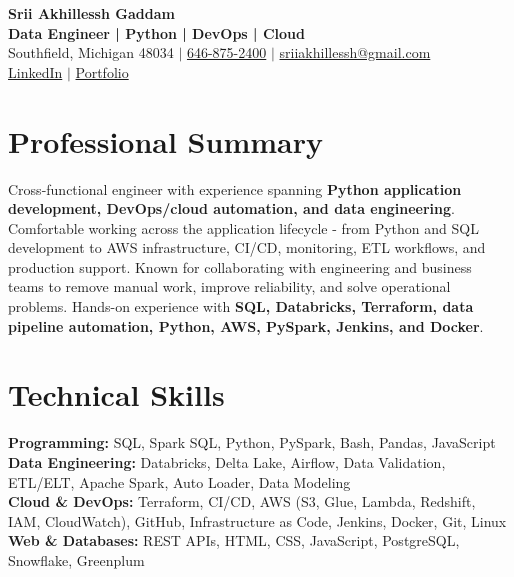 \documentclass[letterpaper,10pt]{article}
\begin{document}
\fontsize{9.35pt}{10.45pt}\selectfont

\begin{center}
    {\LARGE \textbf{Srii Akhillessh Gaddam}} \\[-1pt]
    \textbf{Data Engineer | Python | DevOps | Cloud} \\[2pt]
    Southfield, Michigan 48034 $|$
    \href{tel:6468752400}{646-875-2400} $|$
    \href{mailto:sriiakhillessh@gmail.com}{sriiakhillessh@gmail.com} \\[1pt]
    \href{https://www.linkedin.com/in/srii-akhiilessh-gaddam-b48668191/}{LinkedIn} $|$
    \href{https://sriiakhillesshg.github.io/portfolio/}{Portfolio}
\end{center}
\vspace{-8pt}

\section{Professional Summary}
\small{Cross-functional engineer with experience spanning \textbf{Python application development, DevOps/cloud automation, and data engineering}. Comfortable working across the application lifecycle - from Python and SQL development to AWS infrastructure, CI/CD, monitoring, ETL workflows, and production support. Known for collaborating with engineering and business teams to remove manual work, improve reliability, and solve operational problems. Hands-on experience with \textbf{SQL, Databricks, Terraform, data pipeline automation, Python, AWS, PySpark, Jenkins, and Docker}.}

\section{Technical Skills}
\small{
\textbf{Programming:} SQL, Spark SQL, Python, PySpark, Bash, Pandas, JavaScript \\
\textbf{Data Engineering:} Databricks, Delta Lake, Airflow, Data Validation, ETL/ELT, Apache Spark, Auto Loader, Data Modeling \\
\textbf{Cloud \& DevOps:} Terraform, CI/CD, AWS (S3, Glue, Lambda, Redshift, IAM, CloudWatch), GitHub, Infrastructure as Code, Jenkins, Docker, Git, Linux \\
\textbf{Web \& Databases:} REST APIs, HTML, CSS, JavaScript, PostgreSQL, Snowflake, Greenplum
}
\end{document}
